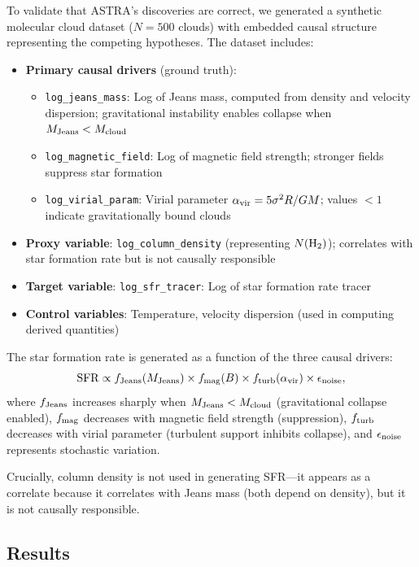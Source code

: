 \documentclass[usenatbib]{rasti}
\begin{document}
To validate that ASTRA's discoveries are correct, we generated a synthetic molecular cloud dataset ($N = 500$ clouds) with embedded causal structure representing the competing hypotheses. The dataset includes:

\begin{itemize}
\item \textbf{Primary causal drivers} (ground truth):
  \begin{itemize}
  \item \texttt{log\_jeans\_mass}: Log of Jeans mass, computed from density and velocity dispersion; gravitational instability enables collapse when $M_{\rm Jeans} < M_{\rm cloud}$
  \item \texttt{log\_magnetic\_field}: Log of magnetic field strength; stronger fields suppress star formation
  \item \texttt{log\_virial\_param}: Virial parameter $\alpha_{\rm vir} = 5\sigma^2R/GM$; values $<1$ indicate gravitationally bound clouds
  \end{itemize}
\item \textbf{Proxy variable}: \texttt{log\_column\_density} (representing $N({\rm H_2})$); correlates with star formation rate but is not causally responsible
\item \textbf{Target variable}: \texttt{log\_sfr\_tracer}: Log of star formation rate tracer
\item \textbf{Control variables}: Temperature, velocity dispersion (used in computing derived quantities)
\end{itemize}

The star formation rate is generated as a function of the three causal drivers:
\begin{equation}
{\rm SFR} \propto f_{\rm Jeans}(M_{\rm Jeans}) \times f_{\rm mag}(B) \times f_{\rm turb}(\alpha_{\rm vir}) \times \epsilon_{\rm noise},
\end{equation}
where $f_{\rm Jeans}$ increases sharply when $M_{\rm Jeans} < M_{\rm cloud}$ (gravitational collapse enabled), $f_{\rm mag}$ decreases with magnetic field strength (suppression), $f_{\rm turb}$ decreases with virial parameter (turbulent support inhibits collapse), and $\epsilon_{\rm noise}$ represents stochastic variation.

Crucially, column density is not used in generating SFR---it appears as a correlate because it correlates with Jeans mass (both depend on density), but it is not causally responsible.

\subsection{Results}
\end{document}
